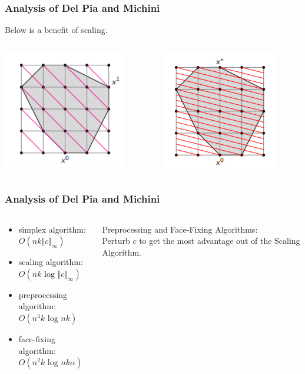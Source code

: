 \documentclass{beamer}
\begin{document}
\begin{frame}
	\frametitle{Analysis of Del Pia and Michini}
	Below is a benefit of scaling.
	\begin{columns}[T]
		\begin{column}{.5\textwidth}
			\begin{center}
				\includegraphics[]{benefit1.png}
			\end{center}
		\end{column}
		\begin{column}{.5\textwidth}
			\begin{center}
				\includegraphics[]{benefit2.png}
			\end{center}
		\end{column}
	\end{columns}
\end{frame}

\begin{frame}
	\frametitle{Analysis of Del Pia and Michini}
	\begin{columns}[T]
		\begin{column}{.5\textwidth}
			\begin{itemize}
				\item simplex algorithm: \\
				$O(nk \Vert c \Vert_\infty)$
				\item scaling algorithm: \\
				$O(nk \text{ log } \Vert c \Vert_\infty)$
				\item preprocessing algorithm: \\
				$O(n^4k \text{ log } nk)$
				\item face-fixing algorithm: \\
				$O(n^2k \text{ log } nk\alpha)$
			\end{itemize}
		\end{column}
		\begin{column}{.5\textwidth}
			Preprocessing and Face-Fixing Algorithms: \\
			Perturb $c$ to get the most advantage out of the Scaling Algorithm.
		\end{column}
	\end{columns}
\end{frame}
\end{document}
